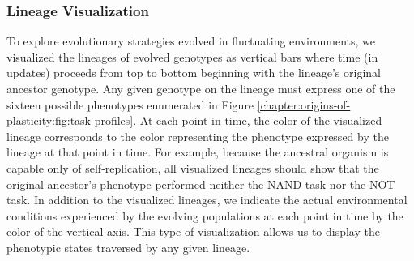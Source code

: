 

\subsubsection{Lineage Visualization}
\label{chapter:origins-of-plasticity:sec:methods:experimental-design:lineage-visualization}

To explore evolutionary strategies evolved in fluctuating environments, we visualized the lineages of evolved genotypes as vertical bars where time (in updates) proceeds from top to bottom beginning with the lineage's original ancestor genotype.
Any given genotype on the lineage must express one of the sixteen possible phenotypes enumerated in Figure \ref{chapter:origins-of-plasticity:fig:task-profiles}.
At each point in time, the color of the visualized lineage corresponds to the color representing the phenotype expressed by the lineage at that point in time. 
For example, because the ancestral organism is capable only of self-replication, all visualized lineages should show that the original ancestor's phenotype performed neither the NAND task nor the NOT task. 
In addition to the visualized lineages, we indicate the actual environmental conditions experienced by the evolving populations at each point in time by the color of the vertical axis. 
This type of visualization allows us to display the phenotypic states traversed by any given lineage. %
